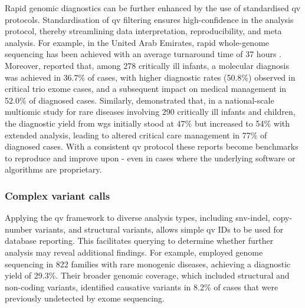Rapid genomic diagnostics can be further enhanced by the use of standardised \ac{qv} protocols. Standardisation of \ac{qv} filtering ensures high-confidence in the analysis protocol, thereby streamlining data interpretation, reproducibility, and meta analysis. For example, in the United Arab Emirates, rapid whole-genome sequencing has been achieved with an average turnaround time of 37 hours \citep{abou2023rapid}. Moreover, \citet{meng2017use} reported that, among 278 critically ill infants, a molecular diagnosis was achieved in 36.7\% of cases, with higher diagnostic rates (50.8\%) observed in critical trio exome cases, and a subsequent impact on medical management in 52.0\% of diagnosed cases. Similarly, \citet{lunke2023integrated} demonstrated that, in a national-scale multiomic study for rare diseases involving 290 critically ill infants and children, the diagnostic yield from \ac{wgs} initially stood at 47\% but increased to 54\% with extended analysis, leading to altered critical care management in 77\% of diagnosed cases.
With a consistent \ac{qv} protocol these reports become benchmarks to reproduce and improve upon - even in cases where the underlying software or algorithms are proprietary.

\subsubsection{Complex variant calls}

Applying the \ac{qv}  framework to diverse analysis types, including \ac{snv}-\ac{indel}, copy-number variants, and structural variants, allows simple \ac{qv}  IDs to be used for database reporting. This facilitates querying to determine whether further analysis may reveal additional findings. For example, \citet{wojcik2024genome} employed genome sequencing in 822 families with rare monogenic diseases, achieving a diagnostic yield of 29.3\%. Their broader genomic coverage, which included structural and non-coding variants, identified causative variants in 8.2\% of cases that were previously undetected by exome sequencing.



